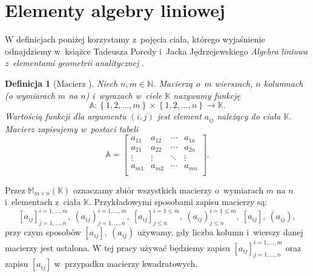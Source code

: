 \documentclass[12pt,a4paper]{report}
\newtheorem{df}{Definicja}[chapter]
\newcommand{\set}[1]{\left\lbrace {#1} \right\rbrace}
\newcommand{\setK}{\mathbb{K}}
\newcommand{\setN}{\mathbb{N}}
\begin{document}
\section{Elementy algebry liniowej}

W definicjach poniżej korzystamy z~pojęcia ciała, którego wyjaśnienie odnajdziemy w~książce Tadeusza Poredy i~Jacka Jędrzejewskiego \textit{Algebra liniowa z~elementami geometrii analitycznej} {\citep[Sec 4.4]{alzega}}.

\begin{df}[Macierz {\citep[Sec 8.1 Def. 8.1]{alzega}}]
Niech $n,m \in \setN$. Macierzą o~$m$ wierszach, $n$ kolumnach (o wymiarach $m$ na $n$) i~wyrazach w~ciele $\setK$ nazywamy funkcję 
$$
\mathbb{A}: \set{1,2, \ldots ,m}\times \set{1,2, \ldots ,n} \to \setK.
$$
Wartością funkcji dla argumentu $(i,j)$ jest element $a_{ij}$  należący do ciała $\setK$. Macierz zapisujemy w~postaci tabeli
$$
\mathbb{A} = \left[
        \begin{array}{cccc}
         a_{11} & a_{12} & \cdots & a_{1n} \\
         a_{21} & a_{22} & \cdots & a_{2n} \\
         \vdots & \vdots & \ddots & \vdots \\
         a_{m1} & a_{m2} & \cdots & a_{mn} \\
         \end{array}
      \right].
$$
\end{df}
\bigskip
Przez $\mathbb{M}_{m \times n}(\setK)$ oznaczamy zbiór wszystkich macierzy o~wymiarach $m$ na $n$ i~elementach z~ciała $\setK$. Przykładowymi sposobami zapisu macierzy są:
$$
[a_{ij}]_{j = 1, \ldots, n}^{i = 1, \ldots , m}, \: (a_{ij})_{j = 1, \ldots, n}^{i = 1, \ldots , m}, \: [a_{ij}]_{j \leq n}^{i = 1 \leq m}, \: (a_{ij})_{j \leq n}^{i = 1 \leq m}, \: [a_{ij}], \: (a_{ij}),
$$
przy czym sposobów $[a_{ij}], \: (a_{ij})$ używamy, gdy liczba kolumn i~wierszy danej macierzy jest ustalona. 
W tej pracy używać będziemy zapisu $[a_{ij}]_{j = 1, \ldots, n}^{i = 1, \ldots , m}$ oraz zapisu $[a_{ij}]$ w~przypadku macierzy kwadratowych.
\end{document}
